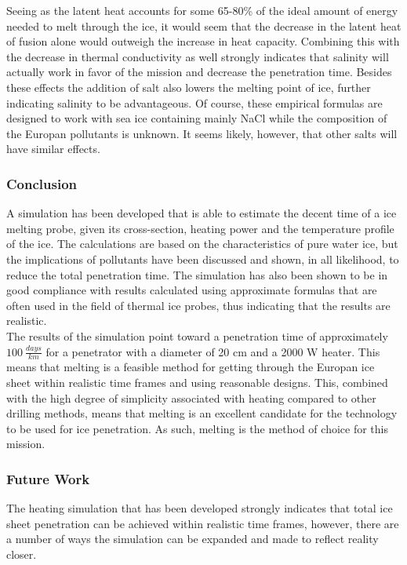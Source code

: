 \noindent
Seeing as the latent heat accounts for some 65-80\% of the ideal amount of energy needed to melt through the ice, it would seem that the decrease in the latent heat of fusion alone would outweigh the increase in heat capacity. Combining this with the decrease in thermal conductivity as well strongly indicates that salinity will actually work in favor of the mission and decrease the penetration time. Besides these effects the addition of salt also lowers the melting point of ice, further indicating salinity to be advantageous. Of course, these empirical formulas are designed to work with sea ice containing mainly NaCl while the composition of the Europan pollutants is unknown. It seems likely, however, that other salts will have similar effects. 

\subsubsection{Conclusion}
A simulation has been developed that is able to estimate the decent time of a ice melting probe, given its cross-section, heating power and the temperature profile of the ice. The calculations are based on the characteristics of pure water ice, but the implications of pollutants have been discussed and shown, in all likelihood, to reduce the total penetration time. The simulation has also been shown to be in good compliance with results calculated using approximate formulas that are often used in the field of thermal ice probes, thus indicating that the results are realistic. \\

\noindent
The results of the simulation point toward a penetration time of approximately $\SI{100}{\frac{days}{km}}$ for a penetrator with a diameter of 20 cm and a 2000 W heater. This means that melting is a feasible method for getting through the Europan ice sheet within realistic time frames and using reasonable designs. This, combined with the high degree of simplicity associated with heating compared to other drilling methods, means that melting is an excellent candidate for the technology to be used for ice penetration. As such, melting is the method of choice for this mission.

\subsubsection{Future Work}
The heating simulation that has been developed strongly indicates that total ice sheet penetration can be achieved within realistic time frames, however, there are a number of ways the simulation can be expanded and made to reflect reality closer.\\

